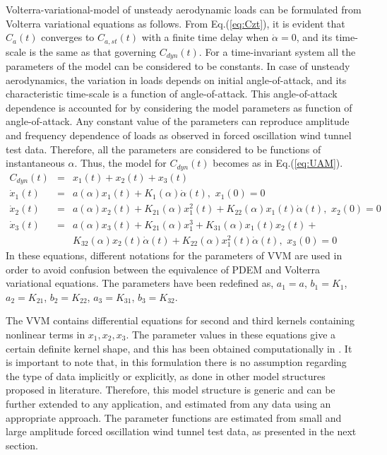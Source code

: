 \documentclass{AIAA}
\begin{document}
Volterra-variational-model of unsteady aerodynamic loads can be formulated from Volterra variational equations as follows. From Eq.(\ref{eq:Czt}), it is evident that $C_a(t)$ converges to $C_{a,st}(t)$  with a finite time delay when $\dot{\alpha}=0$, and its time-scale is the same as that governing $C_{dyn}(t)$. For a time-invariant system all the parameters of the model can be considered to be constants. In case of unsteady aerodynamics, the variation in loads depends on initial angle-of-attack, and its characteristic time-scale is a function of angle-of-attack. This angle-of-attack dependence is accounted for by considering the model parameters as function of angle-of-attack. Any constant value of the parameters can reproduce amplitude and frequency dependence of loads as observed in forced oscillation wind tunnel test data. Therefore, all the parameters are considered to be functions of instantaneous $\alpha$. Thus, the model for $C_{dyn}(t)$ becomes as in Eq.(\ref{eq:UAM}).
\begin{eqnarray}
\label{eq:UAM}
C_{dyn}(t)&=& x_1(t) + x_2(t) +x_3(t) \nonumber \\
\dot{x}_1(t)&=&a(\alpha)x_1(t)+ K_1(\alpha)\dot{\alpha}(t), \, \, x_1(0)=0 \nonumber \\
\dot{x}_2(t)&=&a(\alpha)x_2(t)+ K_{21}(\alpha)x_1^{2}(t) + K_{22}(\alpha)x_1(t)\dot{\alpha}(t), \, \, x_2(0)=0 \nonumber \\
\dot{x}_3(t)&=&a(\alpha)x_3(t)+ K_{21}(\alpha)x_1^{3}+ K_{31}(\alpha)x_1(t)x_2(t)  + \nonumber \\
&& K_{32}(\alpha)x_2(t)\dot{\alpha}(t) + K_{22}(\alpha)x_1^{2}(t)\dot{\alpha}(t) , \, \, x_3(0)=0
\end{eqnarray}
In these equations, different notations for the parameters of VVM are used in order to avoid confusion between the equivalence of PDEM and Volterra variational equations. The parameters have been redefined as, $a_1= a $, $b_1=K_1$, $a_2=K_{21}$, $b_2=K_{22}$, $a_3=K_{31}$, $b_3=K_{32}$.

The VVM contains differential equations for second and third kernels containing nonlinear terms in $x_1, x_2, x_3$. The parameter values in these equations give a certain definite kernel shape, and this has been obtained computationally in \cite{OmranACC}. It is important to note that, in this formulation there is no assumption regarding the type of data implicitly or explicitly, as done in other model structures proposed in literature. Therefore, this model structure is generic and can be further extended to any application, and estimated from any data using an appropriate approach. The parameter functions are estimated from small and large amplitude forced oscillation wind tunnel test data, as presented in the next section.
\end{document}
